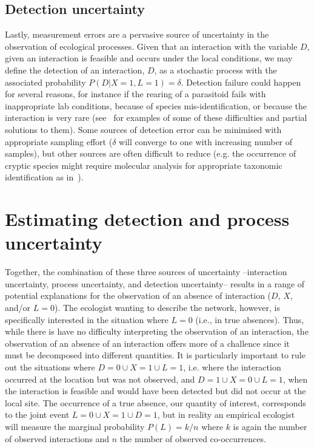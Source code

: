 \documentclass[12pt]{article}
\begin{document}
\begin{spacing}{2.0}
    \subsection*{Detection uncertainty} 

    Lastly, measurement errors are a pervasive source of uncertainty in the observation of ecological processes. Given that an interaction with the variable $D$, given an interaction is feasible and occurs under the local conditions, we may define the detection of an interaction, $D$, as a stochastic process with the associated probability $P(D|X=1,L=1)=\delta$. Detection failure could happen for several reasons, for instance if the rearing of a parasitoid fails with inappropriate lab conditions, because of species mis-identification, or because the interaction is very rare (see~\citet{Wirta2014} for examples of some of these difficulties and partial solutions to them). Some sources of detection error can be minimised with appropriate sampling effort ($\delta$ will converge to one with increasing number of samples), but other sources are often difficult to reduce (e.g. the occurrence of cryptic species might require molecular analysis for appropriate taxonomic identification as in~\citealt{Wirta2014,Frost2016}).


\section*{Estimating detection and process uncertainty}

    Together, the combination of these three sources of uncertainty --interaction uncertainty, process uncertainty, and detection uncertainty-- results in a range of potential explanations for the observation of an absence of interaction ($D$, $X$, and/or $L = 0$). The ecologist wanting to describe the network, however, is specifically interested in the situation where $L = 0$ (i.e., in true absences). Thus, while there is have no difficulty interpreting the observation of an interaction, the observation of an absence of an interaction offers more of a challence since it must be decomposed into different quantities. It is particularly important to rule out the situations where $D=0 \cup X = 1 \cup L=1$, i.e. where the interaction occurred at the location but was not observed, and $D=1 \cup X = 0 \cup L =1$, when the interaction is feasible and would have been detected but did not occur at the local site. The occurrence of a true absence, our quantity of interest, corresponds to the joint event $L=0 \cup X=1 \cup D=1$, but in reality an empirical ecologist will measure the marginal probability $P(L) = k/n$ where $k$ is again the number of observed interactions and $n$ the number of observed co-occurrences.



\end{spacing}
\end{document}
